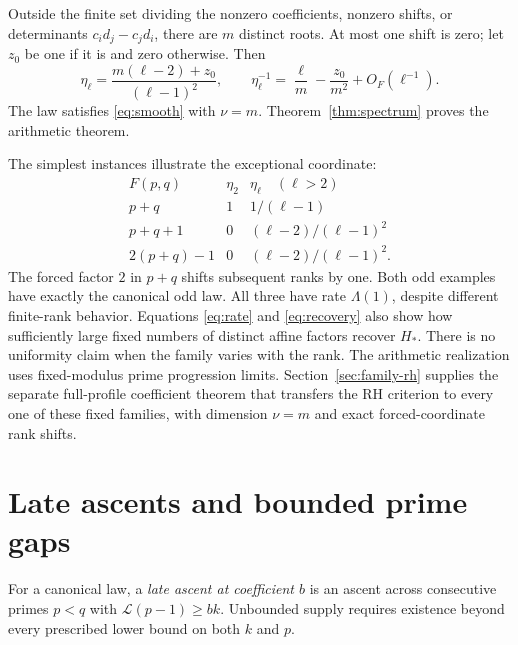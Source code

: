 \documentclass[11pt]{article}
\theoremstyle{definition}
\newcommand{\LL}{\mathcal L}
\begin{document}
Outside the finite set dividing the nonzero coefficients,
nonzero shifts, or determinants $c_id_j-c_jd_i$, there are
$m$ distinct roots. At most one shift is zero; let $z_0$ be
one if it is and zero otherwise. Then
\begin{equation}\label{eq:genericlocal}
 \eta_\ell=\frac{m(\ell-2)+z_0}{(\ell-1)^2},\qquad
 \eta_\ell^{-1}=\frac{\ell}{m}-\frac{z_0}{m^2}+O_F(\ell^{-1}).
\end{equation}
The law satisfies \eqref{eq:smooth} with $\nu=m$.
Theorem~\ref{thm:spectrum} proves the arithmetic theorem.

The simplest instances illustrate the exceptional coordinate:
\[
\begin{array}{c|c|c}
 F(p,q)&\eta_2&\eta_\ell\quad(\ell>2)\\ \hline
 p+q&1&1/(\ell-1)\\
 p+q+1&0&(\ell-2)/(\ell-1)^2\\
 2(p+q)-1&0&(\ell-2)/(\ell-1)^2 .
\end{array}
\]
The forced factor $2$ in $p+q$ shifts subsequent ranks by one.
Both odd examples have exactly the canonical odd law.
All three have rate $\Lambda(1)$, despite different finite-rank
behavior. Equations \eqref{eq:rate} and \eqref{eq:recovery}
also show how sufficiently large fixed numbers of distinct affine
factors recover $H_*$. There is no uniformity claim when the family
varies with the rank. The arithmetic realization uses fixed-modulus
prime progression limits. Section~\ref{sec:family-rh} supplies the
separate full-profile coefficient theorem that transfers the RH
criterion to every one of these fixed families, with dimension $\nu=m$
and exact forced-coordinate rank shifts.

\section{Late ascents and bounded prime gaps}\label{sec:late}
For a canonical law, a \emph{late ascent at coefficient $b$}
is an ascent across consecutive primes $p<q$ with
$\LL(p-1)\ge bk$. Unbounded supply requires existence beyond
every prescribed lower bound on both $k$ and $p$.
\end{document}
